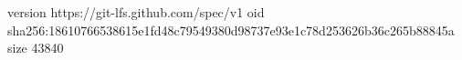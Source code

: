 version https://git-lfs.github.com/spec/v1
oid sha256:18610766538615e1fd48c79549380d98737e93e1c78d253626b36c265b88845a
size 43840
